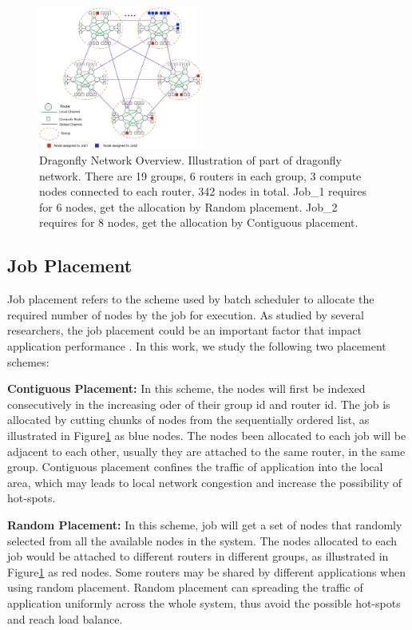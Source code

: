 \documentclass[conference,compsoc]{IEEEtran}
\begin{document}
\begin{figure}[h!] 
  \centering
  \includegraphics[width=0.48\textwidth]{dragonfly-overview}
  \caption{Dragonfly Network Overview. Illustration of part of dragonfly network. There are 19 groups, 6 routers in each group, 3 compute nodes connected to each router, 342 nodes in total. Job\_1 requires for 6 nodes, get the allocation by Random placement. Job\_2 requires for 8 nodes, get the allocation by Contiguous placement. }
  \label{fig: dragonfly overview}
\end{figure}


\subsection{Job Placement}
\label{sec:placement-routing}

Job placement refers to the scheme used by batch scheduler to allocate the required number of nodes by the job for execution. As studied by several researchers, the job placement could be an important factor that impact application performance \cite{hoefler-hpdc14} \cite{bhatele-sc11} \cite{jain-sc14}. In this work, we study the following two placement schemes:

\textbf{Contiguous Placement:} In this scheme, the nodes will first be indexed consecutively in the increasing oder of their group id and router id. The job is allocated by cutting chunks of nodes from the sequentially ordered list, as illustrated in Figure\ref{fig: dragonfly overview} as blue nodes. The nodes been allocated to each job will be adjacent to each other, usually they are attached to the same router, in the same group. Contiguous placement confines the traffic of application into the local area, which may leads to local network congestion and increase the possibility of hot-spots. 

\textbf{Random Placement:} In this scheme, job will get a set of nodes that randomly selected from all the available nodes in the system. The nodes allocated to each job would be attached to different routers in different groups, as illustrated in Figure\ref{fig: dragonfly overview} as red nodes. Some routers may be shared by different applications when using random placement. Random placement can spreading the traffic of application uniformly across the whole system, thus avoid the possible hot-spots and reach load balance.
\end{document}
